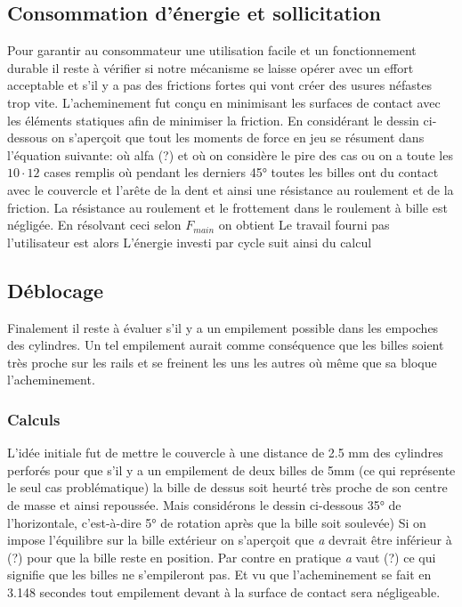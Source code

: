 \subsection{Consommation d'énergie et sollicitation}
Pour garantir au consommateur une utilisation facile et un fonctionnement durable il reste à vérifier si notre mécanisme se laisse opérer avec un effort acceptable et s'il y a pas des frictions fortes qui vont créer des usures néfastes trop vite. L'acheminement fut conçu en minimisant les surfaces de contact avec les éléments statiques afin de minimiser la friction. En considérant le dessin ci-dessous on s'aperçoit que tout les moments de force en jeu se résument dans l'équation suivante:
où alfa (?) %
et où on considère le pire des cas ou on a toute les \(10 \cdot 12\) cases remplis où pendant les derniers \ang{45} toutes les billes ont du contact avec le couvercle et l'arête de la dent et ainsi une résistance au roulement et de la friction. La résistance au roulement et le frottement dans le roulement à bille est négligée.
En résolvant ceci selon $F_{main}$ on obtient
Le travail fourni pas l'utilisateur est alors 
L'énergie investi par cycle suit ainsi du calcul
\subsection{Déblocage}
Finalement il reste à évaluer s'il y a un empilement possible dans les empoches des cylindres. Un tel empilement aurait comme conséquence que les billes soient très proche sur les rails et se freinent les uns les autres où même que sa bloque l'acheminement.

\subsubsection{Calculs}
L'idée initiale fut de mettre le couvercle à une distance de 2.5 mm des cylindres perforés pour que s'il y a un empilement de deux billes de 5mm (ce qui représente le seul cas problématique) la bille de dessus soit heurté très proche de son centre de masse et ainsi repoussée.
Mais considérons le dessin ci-dessous \ang{35} de l'horizontale, c'est-à-dire \ang{5} de rotation après que la bille soit soulevée)
Si on impose l'équilibre sur la bille extérieur
on s'aperçoit que \textit{a} devrait être inférieur à (?) pour que la bille reste en position. Par contre en pratique \textit{a} vaut (?) ce qui signifie que les billes ne s'empileront pas. Et vu que l'acheminement se fait en 3.148 secondes tout empilement devant à la surface de contact sera négligeable.

